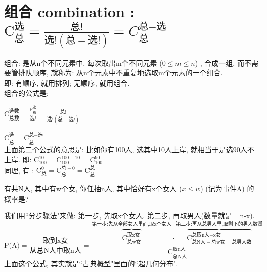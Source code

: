 \documentclass[UTF8]{ctexart}
\begin{document}
	
	
	
	
	
	\section{组合 combination : $ 
		\text{C}_{\text{总}}^{\text{选}}=\frac{\text{总!}}{\text{选!}\left( \text{总}-\text{选!} \right)}	= C_{\text{总}}^{\text{总}-\text{选}}	$}
	
	组合: 是从n个不同元素中, 每次取出m个不同元素 ($0 \leq m \leq n$) , 合成一组, 而不需要管排队顺序, 就称为: 从n个元素中不重复地选取m个元素的一个组合. \\
	
	即: 有顺序, 就用排列; 无顺序, 就用组合. \\
	
	组合的公式是: 
	
	$\boxed{
		\text{C}_{\text{总数}}^{\text{选数}}=\frac{\text{P}_{\text{总}}^{\text{选}}}{\text{选!}}=\frac{\text{总!}}{\text{选!}\left( \text{总}-\text{选!} \right)}	
	}$
	
	$\boxed{
		\text{C}_{\text{总}}^{\text{选}}=\text{C}_{\text{总}}^{\text{总}-\text{选}}	
	}$ \\
	
	上面第二个公式的意思是: 比如你有100人, 选其中10人上岸, 就相当于是选90人不上岸. 即: $\text{C}_{100}^{10}=\text{C}_{100}^{100-10}=\text{C}_{100}^{90}
	$ \\
	
	同理, 有 : $
	\boxed{\text{C}_{\text{总}}^{0}=\text{C}_{\text{总}}^{\text{总}-0}=\text{C}_{\text{总}}^{\text{总}}
	}$ \\
	
	
	\begin{myEnvSample}
		有共N人, 其中有w个女, 你任抽n人, 其中恰好有x个女人 ($x \leq w$) (记为事件A) 的概率是? 
		
		我们用``分步骤法"来做: 第一步, 先取x个女人. 第二步, 再取男人(数量就是= n-x). \\
		
		$
		\text{P(A)}=\dfrac{\text{取到x女}}{\text{从总N人中取n人}}=\dfrac{\overset{\text{第一步:先从全部女人里面,取x个女人}}{\overbrace{\text{C}_{\text{总w女}}^{\text{取x女}}}}\cdot \overset{\text{第二步:再从总男人里,取剩下的男人数量}}{\overbrace{\text{C}_{\text{总N人}-\text{总w女}=\text{总男人数}}^{\text{总取n人}-\text{x女}}}}}{\text{C}_{\text{总N人}}^{\text{取n人}}}
		$ \\
		
		上面这个公式, 其实就是``古典概型"里面的``超几何分布".
	\end{myEnvSample}
	\vspace{1em} 
	
\end{document}

